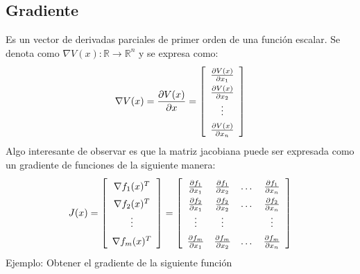 \documentclass[12pt,spanish,lettersize]{report}
\begin{document}
\subsection{Gradiente}
Es un vector de derivadas parciales de primer orden de una funci\'on escalar. Se denota como $\nabla V(x):\mathbb{R}\rightarrow\mathbb{R}^n$ y se expresa como:
\begin{equation}
\nabla V(x)=\frac{\partial V(x)}{\partial x}=\left[
\renewcommand{\arraystretch}{1.5}
\begin{array}{c}
\frac{\partial V(x)}{\partial x_1}\\
\frac{\partial V(x)}{\partial x_2}\\
\vdots\\
\frac{\partial V(x)}{\partial x_n}
\end{array}\right]
\end{equation}
Algo interesante de observar es que la matriz jacobiana puede ser expresada como un gradiente de funciones de la siguiente manera:
\begin{equation}
J(x)=\left[
\renewcommand{\arraystretch}{1.5}
\begin{array}{c}
\nabla f_1(x)^T\\
\nabla f_2(x)^T\\
\vdots\\
\nabla f_m(x)^T\\
\end{array}\right]=\left[
\renewcommand{\arraystretch}{1.5}
\begin{array}{cccc}
\frac{\partial f_1}{\partial x_1}&\frac{\partial f_1}{\partial x_2}&\dots&\frac{\partial f_1}{\partial x_n}\\
\frac{\partial f_2}{\partial x_1}&\frac{\partial f_2}{\partial x_2}&\dots&\frac{\partial f_2}{\partial x_n}\\
\vdots&\vdots&&\vdots\\
\frac{\partial f_m}{\partial x_1}&\frac{\partial f_m}{\partial x_2}&\dots&\frac{\partial f_m}{\partial x_n}
\end{array}\right]
\end{equation}
Ejemplo: Obtener el gradiente de la siguiente funci\'on
\end{document}
